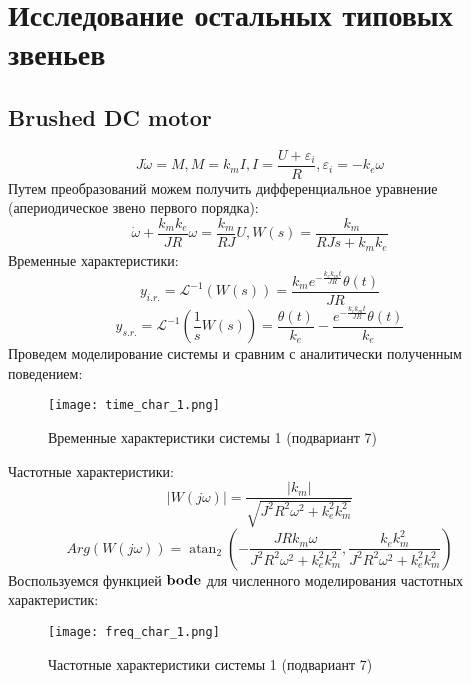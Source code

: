 \section{Исследование остальных типовых звеньев}
\subsection*{Brushed DC motor}
\begin{equation}
    J \dot{\omega} = M, M = k_m I, I = \frac{U+\varepsilon_i}{R}, \varepsilon_i=-k_e \omega
\end{equation}
Путем преобразований можем получить дифференциальное уравнение (апериодическое звено первого порядка):
\begin{equation*}
    \dot{\omega} + \frac{k_mk_e}{JR}\omega =\frac{k_m}{RJ}U, W(s)=\frac{k_m}{RJs + k_mk_e}
\end{equation*}
Временные характеристики:
\begin{equation*}
    y_{i.r.}=\mathcal{L}^{-1}(W(s)) = \frac{k_{m} e^{- \frac{k_{e} k_{m} t}{J R}} \theta(t)}{J R}
\end{equation*}
\begin{equation*}
    y_{s.r.}=\mathcal{L}^{-1}(\frac{1}{s}W(s)) = \frac{\theta(t)}{k_{e}} - \frac{e^{- \frac{k_{e} k_{m} t}{J R}} \theta(t)}{k_{e}}
\end{equation*}
Проведем моделирование системы и сравним с аналитически полученным поведением:
\begin{figure}[h]
    \centering
    \texttt{[image: time\_char\_1.png]}
    \caption{\label{fig:The-caption-1}Временные характеристики системы 1 (подвариант 7)}
\end{figure}

Частотные характеристики:
\begin{equation*}
    |W(j\omega)| = \frac{|{k_{m}}|}{\sqrt{J^{2} R^{2} \omega^{2} + k_{e}^{2} k_{m}^{2}}}
\end{equation*}
\begin{equation*}
    Arg(W(j\omega)) = \operatorname{atan}_{2}{(- \frac{J R k_{m} \omega}{J^{2} R^{2} \omega^{2} + k_{e}^{2} k_{m}^{2}},\frac{k_{e} k_{m}^{2}}{J^{2} R^{2} \omega^{2} + k_{e}^{2} k_{m}^{2}} )}
\end{equation*}
Воспользуемся функцией $\bold{bode}$ для численного моделирования частотных характеристик:
\begin{figure}[]
    \centering
    \texttt{[image: freq\_char\_1.png]}
    \caption{\label{fig:The-caption-1}Частотные характеристики системы 1 (подвариант 7)}
\end{figure}
\pagebreak


